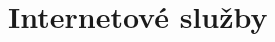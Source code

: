 \documentclass[aspectratio=169,xcolor=dvipsnames, t]{beamer}
\begin{document}

\section{Internetové služby}
\end{document}

